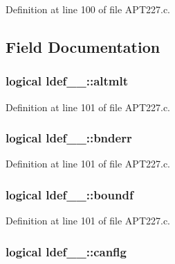 Definition at line 100 of file A\+P\+T227.\+c.



\subsection{Field Documentation}
\subsubsection[{\texorpdfstring{altmlt}{altmlt}}]{\setlength{\rightskip}{0pt plus 5cm}logical ldef\+\_\+\_\+\+::altmlt}\hypertarget{structldef__1___a760a95e10f06e8ca5be1158a5f5bfeb4}{}\label{structldef__1___a760a95e10f06e8ca5be1158a5f5bfeb4}


Definition at line 101 of file A\+P\+T227.\+c.

\subsubsection[{\texorpdfstring{bnderr}{bnderr}}]{\setlength{\rightskip}{0pt plus 5cm}logical ldef\+\_\+\_\+\+::bnderr}\hypertarget{structldef__1___ad481fabe50e2fd12d977ff4d1baacb66}{}\label{structldef__1___ad481fabe50e2fd12d977ff4d1baacb66}


Definition at line 101 of file A\+P\+T227.\+c.

\subsubsection[{\texorpdfstring{boundf}{boundf}}]{\setlength{\rightskip}{0pt plus 5cm}logical ldef\+\_\+\_\+\+::boundf}\hypertarget{structldef__1___a857a66fe9e592c827bade65b63742171}{}\label{structldef__1___a857a66fe9e592c827bade65b63742171}


Definition at line 101 of file A\+P\+T227.\+c.

\subsubsection[{\texorpdfstring{canflg}{canflg}}]{\setlength{\rightskip}{0pt plus 5cm}logical ldef\+\_\+\_\+\+::canflg}\hypertarget{structldef__1___aebe6555c14ff660a4189146a61060f16}{}\label{structldef__1___aebe6555c14ff660a4189146a61060f16}



